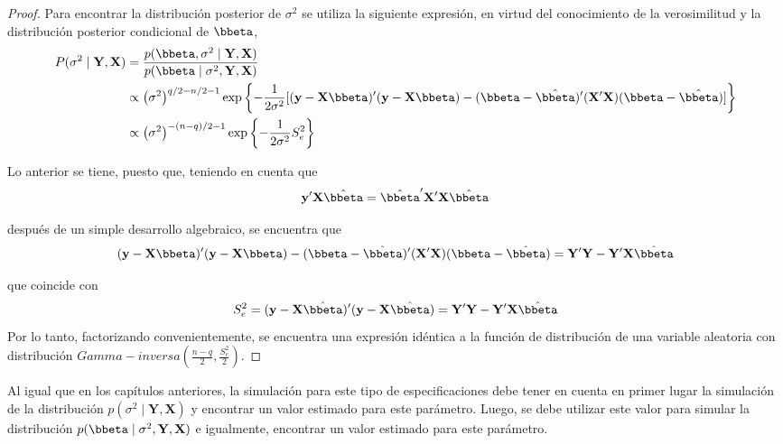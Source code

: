 \begin{proof}
Para encontrar la distribución posterior de $\sigma^2$ se utiliza la siguiente expresión, en virtud del conocimiento de la verosimilitud y la distribución posterior condicional de $\bbeta$,
\begin{align*}
P(\sigma^2 \mid  \mathbf{Y}, \mathbf{X})&=\frac{p(\bbeta,\sigma^2 \mid \mathbf{Y},\mathbf{X})}
{p(\bbeta \mid \sigma^2,\mathbf{Y},\mathbf{X})}\\
&\propto\left(\sigma^2\right)^{q/2-n/2-1}
\exp\left\{-\frac{1}{2\sigma^2}[(\mathbf{y}-\mathbf{X}\bbeta)'(\mathbf{y}-\mathbf{X}\bbeta)
-(\bbeta-\hat{\bbeta})'(\mathbf{X}'\mathbf{X})(\bbeta-\hat{\bbeta})]\right\}\\
&\propto\left(\sigma^2\right)^{-(n-q)/2-1}
\exp\left\{-\frac{1}{2\sigma^2}S^2_e\right\}
\end{align*}

Lo anterior se tiene, puesto que, teniendo en cuenta que
\begin{equation}
\mathbf{y}'\mathbf{X}\hat{\bbeta}=\hat{\bbeta}'\mathbf{X}'\mathbf{X}\hat{\bbeta}
\end{equation}

después de un simple desarrollo algebraico, se encuentra que
\begin{equation*}
(\mathbf{y}-\mathbf{X}\bbeta)'(\mathbf{y}-\mathbf{X}\bbeta)
-(\bbeta-\hat{\bbeta})'(\mathbf{X}'\mathbf{X})(\bbeta-\hat{\bbeta})
=\mathbf{Y}'\mathbf{Y}-\mathbf{Y}'\mathbf{X}\hat{\bbeta}
\end{equation*}

que coincide con
\begin{equation*}
S^2_e=(\mathbf{y}-\mathbf{X}\hat{\bbeta})'(\mathbf{y}-\mathbf{X}\hat{\bbeta})
=\mathbf{Y}'\mathbf{Y}-\mathbf{Y}'\mathbf{X}\hat{\bbeta}
\end{equation*}
Por lo tanto, factorizando convenientemente, se encuentra una expresión idéntica a la
función de distribución de una variable aleatoria con distribución $Gamma-inversa \left(\frac{n-q}{2},\frac{S^2_e}{2}\right)$.
\end{proof}

Al igual que en los capítulos anteriores, la simulación para este tipo de especificaciones debe tener en cuenta en primer lugar la simulación de la distribución $p(\sigma^2 \mid \mathbf{Y},\mathbf{X})$ y encontrar un valor estimado para este parámetro. Luego, se debe utilizar este valor para simular la distribución $p(\bbeta \mid \sigma^2,\mathbf{Y},\mathbf{X})$ e igualmente, encontrar un valor estimado para este parámetro.

